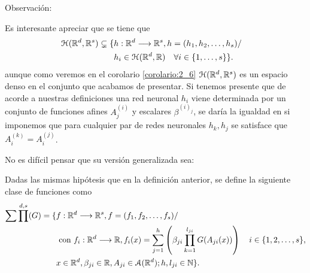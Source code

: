 \iconoAclaraciones \textcolor{dark_green}{ Observación: }


Es interesante apreciar que se tiene que 
    \begin{equation} \label{eq:diferencia_conjuntos_multicapa}
        \begin{split}
        \mathcal{H}(\mathbb{R}^d,\mathbb{R}^s) \subsetneq
        \{ 
            & h: \mathbb{R} ^d \longrightarrow \mathbb{R}^s, h= (h_1, h_2, \ldots, h_s)  / \quad 
            \\ &
            h_i \in \mathcal{H}(\mathbb{R}^d,\mathbb{R}) \quad \forall i \in \{1, \ldots, s\}
        \}.
        \end{split}
    \end{equation}
    aunque como veremos en el corolario \ref{corolario:2_6} $\mathcal{H}(\mathbb{R}^d,\mathbb{R}^s)$ es un espacio denso en el conjunto que acabamos de presentar. 
    Si tenemos presente que de acorde a nuestras definiciones una red neuronal $h_i$ viene determinada por un conjunto de funciones afines $A^{(i)}_j$  y escalares $\beta^{(i)_j}$, se daría la igualdad en  si imponemos que para cualquier par de redes neuronales $h_k, h_j$ se satisface que $A^{(k)}_i = A^{(j)}_i$. 


No es difícil pensar que su versión generalizada sea: 

\begin{definicion} 
    Dadas las mismas hipótesis que en la definición anterior, se define la siguiente clase de funciones como 
    \begin{equation}
        \begin{split}
            \sum \prod^{d, s}(G) 
            = 
        \{ 
            & f: \mathbb{R} ^d \longrightarrow \mathbb{R}^s, f= (f_1, f_2, \ldots , f_s)  / \quad 
            \\ &
            \text{ con } f_i : \mathbb{R} ^d\longrightarrow \mathbb{R}, 
            f_i(x)=\sum_{j = 1} ^h 
            \left(
            \beta_{j i} \prod_{k=1}^{l_{j i}} G(A_{j i}(x))
            \right)
             \quad i \in \{1,2,\ldots, s\}, \\
            & x \in \mathbb{R} ^d, \beta_{j i} \in \mathbb{R}, A_{j i}\in \mathcal{A}(\mathbb{R}^d); h,l_{j i} \in \mathbb{N} 
        \}.
        \end{split}
    \end{equation}
\end{definicion}


